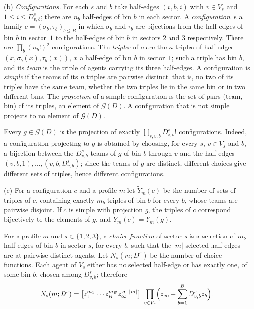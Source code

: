 \smallskip\noindent(b) \emph{Configurations.} For each $s$ and $b$ take half-edges
$(v,b,i)$ with $v\in V_s$ and $1\le i\le D^s_{v,b}$; there are $n_b$ half-edges of bin $b$
in each sector. A \emph{configuration} is a family $c=(\sigma_b,\tau_b)_{b\le B}$ in which
$\sigma_b$ and $\tau_b$ are bijections from the half-edges of bin $b$ in sector~$1$ to the
half-edges of bin $b$ in sectors $2$ and $3$ respectively. There are $\prod_b(n_b!)^2$
configurations. The \emph{triples} of $c$ are the $n$ triples of half-edges
$(x,\sigma_b(x),\tau_b(x))$, $x$ a half-edge of bin $b$ in sector~$1$; such a triple has
bin $b$, and its \emph{team} is the triple of agents carrying its three half-edges. A
configuration is \emph{simple} if the teams of its $n$ triples are pairwise distinct; that
is, no two of its triples have the same team, whether the two triples lie in the same bin
or in two different bins. The \emph{projection} of a simple configuration is the set of
pairs (team, bin) of its triples, an element of $\mathcal{G}(D)$. A configuration that is
not simple projects to no element of $\mathcal{G}(D)$.

Every $g\in\mathcal{G}(D)$ is the projection of exactly $\prod_{s,v,b}D^s_{v,b}!$
configurations. Indeed, a configuration projecting to $g$ is obtained by choosing, for
every $s$, $v\in V_s$ and $b$, a bijection between the $D^s_{v,b}$ teams of $g$ of bin $b$
through $v$ and the half-edges $(v,b,1),\dots,(v,b,D^s_{v,b})$; since the teams of $g$ are
distinct, different choices give different sets of triples, hence different configurations.

\smallskip\noindent(c) For a configuration $c$ and a profile $m$ let $\widetilde Y_m(c)$ be
the number of sets of triples of $c$, containing exactly $m_b$ triples of bin $b$ for every
$b$, whose teams are pairwise disjoint. If $c$ is simple with projection $g$, the triples
of $c$ correspond bijectively to the elements of $g$, and $\widetilde Y_m(c)=Y_m(g)$.

\smallskip
For a profile $m$ and $s\in\{1,2,3\}$, a \emph{choice function} of sector $s$ is a
selection of $m_b$ half-edges of bin $b$ in sector $s$, for every $b$, such that the
$|m|$ selected half-edges are at pairwise distinct agents. Let $N_s(m;D^s)$ be the number
of choice functions. Each agent of $V_s$ either has no selected half-edge or has exactly
one, of some bin $b$, chosen among $D^s_{v,b}$; therefore
\begin{equation}\label{eq:iid-genfn}
N_s(m;D^s)=\bigl[z_1^{m_1}\cdots z_B^{m_B}z_\infty^{\,q-|m|}\bigr]\
\prod_{v\in V_s}\Bigl(z_\infty+\sum_{b=1}^BD^s_{v,b}z_b\Bigr).
\end{equation}

